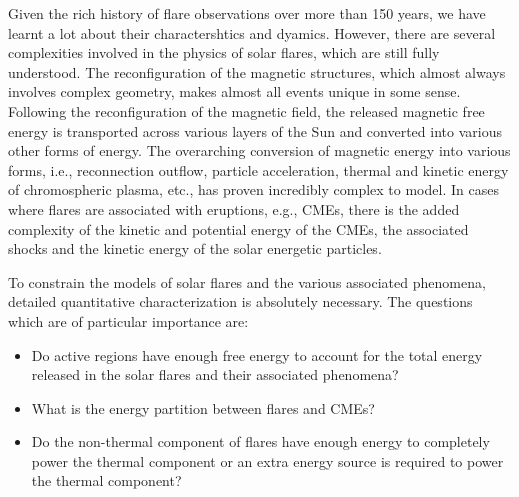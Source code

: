 Given the rich history of flare observations over more than 150 years, we have learnt a lot about their charactershtics and dyamics. However, there are several complexities involved in the physics of solar flares, which are still fully understood. The reconfiguration of the magnetic structures, which almost always involves complex geometry, makes almost all events unique in some sense. Following the reconfiguration of the magnetic field, the released magnetic free energy is transported across various layers of the Sun and converted into various other forms of energy. The overarching conversion of magnetic energy into various forms, i.e., reconnection outflow, particle acceleration, thermal and kinetic energy of chromospheric plasma, etc., has proven incredibly complex to model. In cases where flares are associated with eruptions, e.g., CMEs, there is the added complexity of the kinetic and potential energy of the CMEs, the associated shocks and the kinetic energy of the solar energetic particles.

To constrain the models of solar flares and the various associated phenomena, detailed quantitative characterization is absolutely necessary. %
The questions which are of particular importance are:

\begin{itemize}
    \item Do active regions have enough free energy to account for the total energy released in the solar flares and their associated phenomena?
    \item What is the energy partition between flares and CMEs?
    \item Do the non-thermal component of flares have enough energy to completely power the thermal component or an extra energy source is required to power the thermal component?
\end{itemize}


